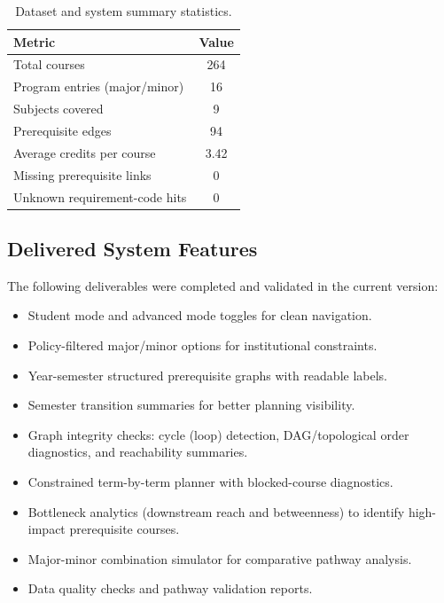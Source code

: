 \begin{table}[tbp]
    \centering
    \caption{Dataset and system summary statistics.}
    \label{tab:summary}
    \begin{tabular}{|l|c|}
        \hline
        Metric & Value \\
        \hline
        Total courses & 264 \\
        Program entries (major/minor) & 16 \\
        Subjects covered & 9 \\
        Prerequisite edges & 94 \\
        Average credits per course & 3.42 \\
        Missing prerequisite links & 0 \\
        Unknown requirement-code hits & 0 \\
        \hline
    \end{tabular}
\end{table}

\subsection{Delivered System Features}
The following deliverables were completed and validated in the current version:

\begin{itemize}
    \item Student mode and advanced mode toggles for clean navigation.
    \item Policy-filtered major/minor options for institutional constraints.
    \item Year-semester structured prerequisite graphs with readable labels.
    \item Semester transition summaries for better planning visibility.
    \item Graph integrity checks: cycle (loop) detection, DAG/topological order
    diagnostics, and reachability summaries.
    \item Constrained term-by-term planner with blocked-course diagnostics.
    \item Bottleneck analytics (downstream reach and betweenness) to identify
    high-impact prerequisite courses.
    \item Major-minor combination simulator for comparative pathway analysis.
    \item Data quality checks and pathway validation reports.
\end{itemize}

